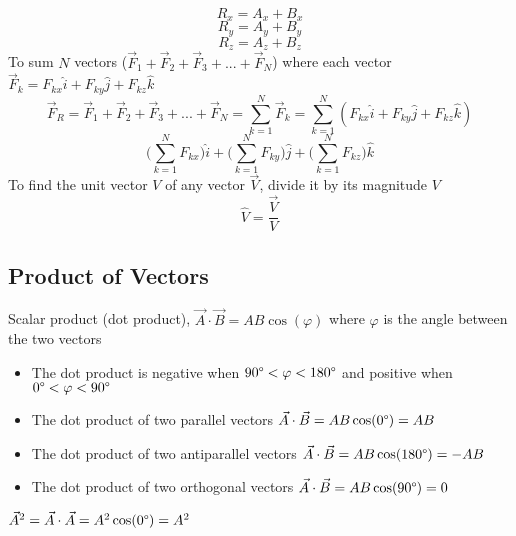 \documentclass[a4paper]{article}
\let\phi\varphi
\begin{document}
    \begin{equation}
        R_x = A_x + B_x
    \end{equation}
    \begin{equation}
        R_y = A_y + B_y
    \end{equation}
    \begin{equation}
        R_z = A_z + B_z
    \end{equation}
    To sum $N$ vectors ($\vec{F}_1 + \vec{F}_2 + \vec{F}_3 + ... + \vec{F}_N$) where each vector $\vec{F}_k = F_{kx}\hat{i} + F_{ky}\hat{j} + F_{kz}\hat{k}$
    \begin{equation}
        \vec{F}_R = \vec{F}_1 + \vec{F}_2 + \vec{F}_3 + ... + \vec{F}_N = \sum_{k=1}^{N}\vec{F}_k = \sum_{k=1}^{N}(F_{kx}\hat{i} + F_{ky}\hat{j} + F_{kz}\hat{k})
    \end{equation}
    \begin{equation}
        \bigg(\sum_{k=1}^{N}F_{kx}\bigg)\hat{i} + \bigg(\sum_{k=1}^{N}F_{ky}\bigg)\hat{j} + \bigg(\sum_{k=1}^{N}F_{kz}\bigg)\hat{k}
    \end{equation}
    To find the unit vector $V$ of any vector $\vec{V}$, divide it by its magnitude $V$
    \begin{equation}
        \hat{V} = \frac{\vec{V}}{V}
    \end{equation} 

    \subsection{Product of Vectors}
    Scalar product (dot product), $\vec{A} \cdot \vec{B} = AB\cos(\phi)$ where $\phi$ is the angle between the two vectors 
    \begin{itemize}
        \item The dot product is negative when $90\degree < \phi < 180\degree$ and positive when $0\degree < \phi < 90\degree$
        \item The dot product of two parallel vectors $\vec{A} \cdot \vec{B} = AB\cos(0\degree) = AB$
        \item The dot product of two antiparallel vectors $\vec{A} \cdot \vec{B} = AB\cos(180\degree) = -AB$
        \item The dot product of two orthogonal vectors $\vec{A} \cdot \vec{B} = AB\cos(90\degree) = 0$
    \end{itemize}
    \begin{center}
        $\vec{A}^2 = \vec{A} \cdot \vec{A} = A^2\cos(0\degree) = A^2$
    \end{center}
\end{document}
